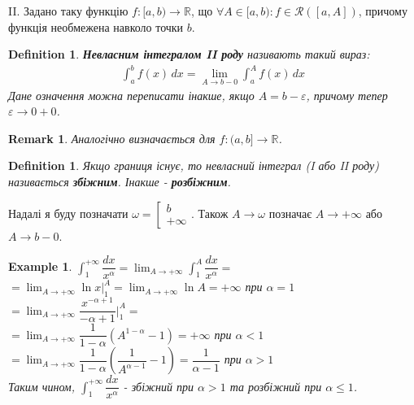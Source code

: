 \documentclass[a4paper, 10pt]{article}
\def\huge{\displaystyle}
\theoremstyle{theoremdd}
\theoremstyle{theoremdd}
\theoremstyle{theoremdd}
\newtheorem{definition}[theorem]{Definition}
\theoremstyle{theoremdd}
\theoremstyle{theoremdd}
\newtheorem{example}[theorem]{Example}
\theoremstyle{theoremdd}
\theoremstyle{theoremdd}
\newtheorem{remark}[theorem]{Remark}
\theoremstyle{theoremdd}
\theoremstyle{theoremdd}
\begin{document}
II. Задано таку функцію $f: [a,b) \to \mathbb{R}$, що $\forall A \in [a,b): f \in \mathcal{R}([a,A])$, причому функція необмежена навколо точки $b$.
\begin{definition}
\textbf{Невласним інтегралом II роду} називають такий вираз:
\begin{align*}
\int_a^b f(x)\,dx = \lim_{A \to b-0} \int_a^{A} f(x)\,dx
\end{align*}
Дане означення можна переписати інакше, якщо $A = b-\varepsilon$, причому тепер $\varepsilon \to 0+0$.
\end{definition}

\begin{remark}
Аналогічно визначається для $f: (a,b] \to \mathbb{R}$.
\end{remark}

\begin{definition}
Якщо границя існує, то невласний інтеграл (I або II роду) називається \textbf{збіжним}. Інакше - \textbf{розбіжним}.
\end{definition}

Надалі я буду позначати $\omega = \left[ \begin{gathered} b \\ +\infty \end{gathered} \right.$. Також $A \to \omega$ позначає $A \to +\infty$ або $A \to b-0$.

\begin{example}
$\huge\int_1^{+\infty} \dfrac{dx}{x^\alpha} = \huge\lim_{A \to +\infty} \int_1^A \dfrac{dx}{x^\alpha} \boxed{=}$\\
$= \huge\lim_{A \to +\infty} \ln x \Big|_1^A = \lim_{A \to +\infty} \ln A = +\infty$ при $\alpha = 1$\\
$= \huge\lim_{A \to +\infty} \dfrac{x^{-\alpha+1}}{-\alpha+1} \Big|_1^A =$\\
$= \huge\lim_{A \to +\infty} \dfrac{1}{1-\alpha} (A^{1-\alpha} - 1) = +\infty$ при $\alpha < 1$\\
$= \huge\lim_{A \to +\infty} \dfrac{1}{1-\alpha} (\dfrac{1}{A^{\alpha-1}} - 1) = \dfrac{1}{\alpha - 1}$ при $\alpha > 1$\\
Таким чином, $\huge\int_1^{+\infty} \dfrac{dx}{x^\alpha}$ - збіжний при $\alpha > 1$ та розбіжний при $\alpha \leq 1$.
\end{example}
\end{document}
